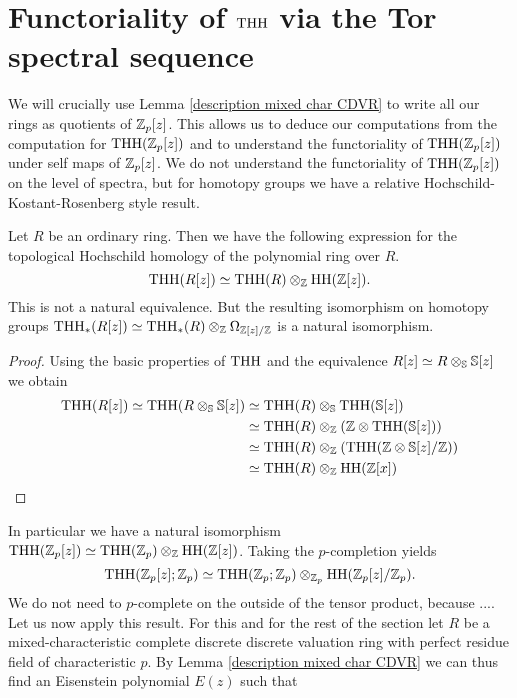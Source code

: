 \section{Functoriality of $\THH$ via the Tor spectral sequence}
We will crucially use Lemma \ref{description mixed char CDVR} to write all our rings as quotients of $\Z_p[z]$. This allows us to deduce our computations from the computation for $\THH(\Z_p[z])$ and to understand the functoriality of $\THH(\Z_p[z])$ under self maps of $\Z_p[z]$. We do not understand the functoriality of $\THH(\Z_p[z])$ on the level of spectra, but for homotopy groups we have a relative Hochschild-Kostant-Rosenberg style result.
\begin{lem}
    Let $R$ be an ordinary ring. Then we have the following expression for the topological Hochschild homology of the polynomial ring over $R$.
    \begin{equation*}
        \THH(R[z])\simeq \THH(R)\otimes_\Z \HH(\Z[z]).
    \end{equation*}
    This is not a natural equivalence. But the resulting isomorphism on homotopy groups $\THH_*(R[z])\simeq \THH_*(R)\otimes_\Z \Omega_{\Z[z]/\Z}$ is a natural isomorphism.
\end{lem}
\begin{proof} Using the basic properties of $\THH$ and the equivalence $R[z]\simeq R\otimes_\S \S[z]$ we obtain
    \begin{align*}
        \THH(R[z])\simeq \THH(R\otimes_\S \S[z])&\simeq\THH(R)\otimes_\S \THH(\S[z]) \\
        &\simeq \THH(R)\otimes_\Z (\Z\otimes \THH(\S[z])) \\
        &\simeq\THH(R)\otimes_\Z (\THH(\Z\otimes \S[z]/\Z))\\
        &\simeq 
         \THH(R)\otimes_\Z \HH(\Z[x])
    \end{align*}\qedhere
\end{proof}
In particular we have a natural isomorphism $\THH(\Z_p[z])\simeq \THH(\Z_p)\otimes_\Z \HH(\Z[z])$. Taking the $p$-completion yields 
\begin{equation*}
    \THH(\Z_p[z];\Z_p)\simeq \THH(\Z_p;\Z_p)\otimes_{\Z_p} \HH(\Z_p[z]/\Z_p).
\end{equation*} 
We do not need to $p$-complete on the outside of the tensor product, because ....\\
Let us now apply this result. For this and for the rest of the section let $R$ be a mixed-characteristic complete discrete discrete valuation ring with perfect residue field of characteristic $p$. By Lemma \ref{description mixed char CDVR} we can thus find an Eisenstein polynomial $E(z)$ such that
